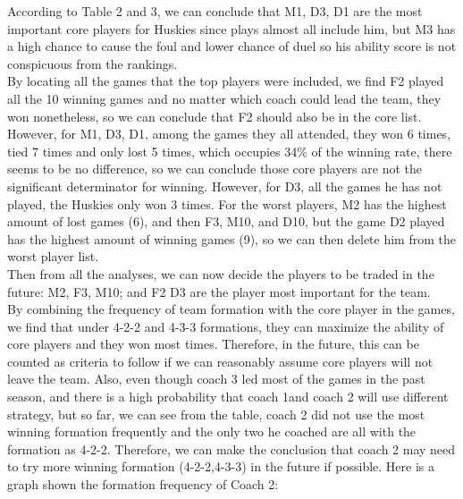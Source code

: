 \documentclass[12pt]{article}
\begin{document}
\newline
According to Table 2 and 3, we can conclude that M1, D3, D1 are the most important core players for Huskies since plays almost all include him, but M3 has a high chance to cause the foul and lower chance of duel so his ability score is not conspicuous from the rankings. \\
\newline
By locating all the games that the top players were included, we find F2 played all the 10 winning games and no matter which coach could lead the team, they won nonetheless, so we can conclude that F2 should also be in the core list. However, for M1, D3, D1, among the games they all attended, they won 6 times, tied 7 times and only lost 5 times, which occupies 34\% of the winning rate, there seems to be no difference, so we can conclude those core players are not the significant determinator for winning. However, for D3, all the games he has not played, the Huskies only won 3 times. For the worst players, M2 has the highest amount of lost games (6), and then F3, M10, and D10, but the game D2 played has the highest amount of winning games (9), so we can then delete him from the worst player list. \\
\newline
Then from all the analyses, we can now decide the players to be traded in the future: M2, F3, M10; and F2 D3 are the player most important for the team. \\
\newline
By combining the frequency of team formation with the core player in the games, we find that under 4-2-2 and 4-3-3 formations, they can maximize the ability of core players and they won most times. Therefore, in the future, this can be counted as criteria to follow if we can reasonably assume core players will not leave the team. Also, even though coach 3 led most of the games in the past season, and there is a high probability that coach 1and coach 2 will use different strategy, but so far, we can see from the table,  coach 2 did not use the most winning formation frequently and the only two he coached are all with the formation as 4-2-2. Therefore, we can make the conclusion that coach 2 may need to try more winning formation (4-2-2,4-3-3) in the future if possible. Here is a graph shown the formation frequency of Coach 2:\\
\end{document}
